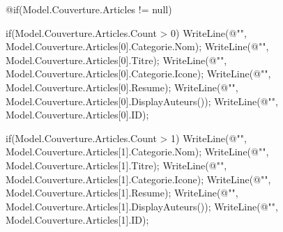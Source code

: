 ﻿%
\fancyhead[C]{} 
\fancyhead[L]{}


\fancyfoot[R]{ } 
\fancyfoot[L]{ }

\date{@Model.Date}%

@if(Model.Couverture.Articles != null)
{
	if(Model.Couverture.Articles.Count > 0)
	{
		WriteLine(@"", Model.Couverture.Articles[0].Categorie.Nom);
		WriteLine(@"", Model.Couverture.Articles[0].Titre);
		WriteLine(@"", Model.Couverture.Articles[0].Categorie.Icone);
		WriteLine(@"", Model.Couverture.Articles[0].Resume);
		WriteLine(@"", Model.Couverture.Articles[0].DisplayAuteurs());
		WriteLine(@"", Model.Couverture.Articles[0].ID);
	}

	if(Model.Couverture.Articles.Count > 1)
	{
		WriteLine(@"", Model.Couverture.Articles[1].Categorie.Nom);
		WriteLine(@"", Model.Couverture.Articles[1].Titre);
		WriteLine(@"", Model.Couverture.Articles[1].Categorie.Icone);
		WriteLine(@"", Model.Couverture.Articles[1].Resume);
		WriteLine(@"", Model.Couverture.Articles[1].DisplayAuteurs());
		WriteLine(@"", Model.Couverture.Articles[1].ID);
	}
}
\couverture
